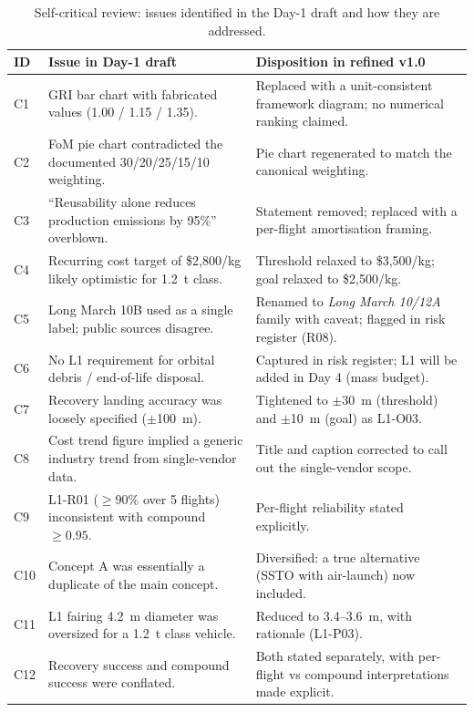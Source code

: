 \documentclass[10pt,a4paper]{article}
\begin{document}
\begin{table}[H]
\centering
\caption{Self-critical review: issues identified in the Day-1 draft and how they are addressed.}
\label{tab:critique}
\small
\begin{tabular}{@{}p{0.9cm}p{5.3cm}p{7.6cm}@{}}
\toprule
\textbf{ID} & \textbf{Issue in Day-1 draft} & \textbf{Disposition in refined v1.0} \\
\midrule
C1 & GRI bar chart with fabricated values (1.00 / 1.15 / 1.35). & Replaced with a unit-consistent framework diagram; no numerical ranking claimed. \\
C2 & FoM pie chart contradicted the documented 30/20/25/15/10 weighting. & Pie chart regenerated to match the canonical weighting. \\
C3 & ``Reusability alone reduces production emissions by 95\%'' overblown. & Statement removed; replaced with a per-flight amortisation framing. \\
C4 & Recurring cost target of \$2,800/kg likely optimistic for 1.2~t class. & Threshold relaxed to \$3,500/kg; goal relaxed to \$2,500/kg. \\
C5 & Long March 10B used as a single label; public sources disagree. & Renamed to \textit{Long March 10/12A} family with caveat; flagged in risk register (R08). \\
C6 & No L1 requirement for orbital debris / end-of-life disposal. & Captured in risk register; L1 will be added in Day 4 (mass budget). \\
C7 & Recovery landing accuracy was loosely specified ($\pm$100~m). & Tightened to $\pm$30~m (threshold) and $\pm$10~m (goal) as L1-O03. \\
C8 & Cost trend figure implied a generic industry trend from single-vendor data. & Title and caption corrected to call out the single-vendor scope. \\
C9 & L1-R01 ($\geq 90\%$ over 5 flights) inconsistent with compound $\geq 0.95$. & Per-flight reliability stated explicitly. \\
C10 & Concept A was essentially a duplicate of the main concept. & Diversified: a true alternative (SSTO with air-launch) now included. \\
C11 & L1 fairing 4.2~m diameter was oversized for a 1.2~t class vehicle. & Reduced to 3.4--3.6~m, with rationale (L1-P03). \\
C12 & Recovery success and compound success were conflated. & Both stated separately, with per-flight vs compound interpretations made explicit. \\
\bottomrule
\end{tabular}
\end{table}
\end{document}
